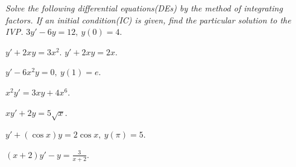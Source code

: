 \documentclass[12pt]{book}
\begin{document}
\vspace{5mm}

\begin{exercise}
\textit{Solve the following differential equations(DEs) by the method of integrating factors. If an initial condition(IC) is given, find the particular solution to the IVP.}
$3y'-6y =12,\ y(0)= 4$.
\end{exercise}


\begin{exercise}
{\color{red}$y'+2xy =3x^2$.}
{\color{blue}$y'+2xy =2x$.}
\end{exercise}


\begin{exercise}
$y'-6x^2y =0,\ y(1)= e$.
\end{exercise}


\begin{exercise}
$x^2y'= 3xy +4x^6 $.
\end{exercise}


\begin{exercise}
$xy'+2y = 5\sqrt{x} $.
\end{exercise}


\begin{exercise}
$y'+(\cos x)y = 2 \cos x,\ y(\pi)= 5 $.
\end{exercise}


\begin{exercise}
$(x+2)y'-y = \frac{3}{x+2} $.
\end{exercise}
\end{document}
